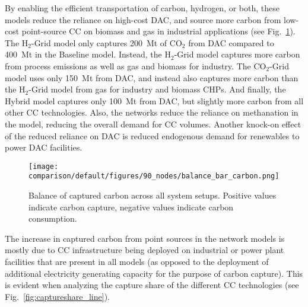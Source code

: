 \documentclass[twocolumn]{article}
\newcommand{\carbon}{CO$_2$}
\newcommand{\modBase}{Baseline model}
\newcommand{\modCO}{CO$_2$-Grid model}
\newcommand{\modH}{H$_2$-Grid model}
\newcommand{\modHybrid}{Hybrid model}
\begin{document}
By enabling the efficient transportation of carbon, hydrogen, or both, these models reduce the reliance on high-cost DAC, and source more carbon from low-cost point-source CC on biomass and gas in industrial applications (see Fig.~\ref{fig:balance_captured_carbon}). The \modH{} only captures \label{}200~Mt of \carbon{} from DAC compared to \label{}400~Mt in the \modBase{}. Instead, the \modH{} captures more carbon from process emissions as well as gas and biomass for industry. The \modCO{} uses only \label{}150~Mt from DAC, and instead also captures more carbon than the \modH{} from gas for industry and biomass CHPs. And finally, the \modHybrid{} captures only \label{}100~Mt from DAC, but slightly more carbon from all other CC technologies.
Also, the networks reduce the reliance on methanation in the model, reducing the overall demand for CC volumes. Another knock-on effect of the reduced reliance on DAC is reduced endogenous demand for renewables to power DAC facilities.


\begin{figure}[ht!]
    \centering
    \texttt{[image: comparison/default/figures/90\_nodes/balance\_bar\_carbon.png]}
    \caption{Balance of captured carbon across all system setups. Positive values indicate carbon capture, negative values indicate carbon consumption.}
    \label{fig:balance_captured_carbon}
\end{figure}




The increase in captured carbon from point sources in the network models is mostly due to CC infrastructure being deployed on industrial or power plant facilities that are present in all models (as opposed to the deployment of additional electricity generating capacity for the purpose of carbon capture). This is evident when analyzing the capture share of the different CC technologies (see Fig.~\ref{fig:captureshare_line}).
\end{document}
